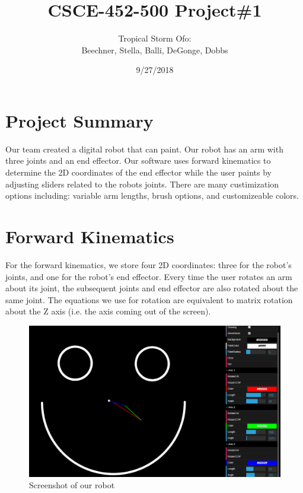 \documentclass{article}
\title{CSCE-452-500 Project\#1}
\author{Tropical Storm Ofo: \\ Beechner, Stella, Balli, DeGonge, Dobbs}
\date{9/27/2018}
\begin{document}
\maketitle %

\section*{Project Summary}
Our team created a digital robot that can paint. Our robot has an arm with three joints and an end effector. Our software uses forward kinematics to determine the 2D coordinates of the end effector while the user paints by adjusting sliders related to the robots joints. There are many custimization options including: variable arm lengths, brush options, and customizeable colors.

\section*{Forward Kinematics}
For the forward kinematics, we store four 2D coordinates: three for the robot's joints, and one for the robot's end effector. Every time the user rotates an arm about its joint, the subsequent joints and end effector are also rotated about the same joint. The equations we use for rotation are equivalent to matrix rotation about the Z axis (i.e. the axis coming out of the screen). 

\begin{figure}
\includegraphics[width=\linewidth]{screen.png}
\caption{Screenshot of our robot}
\end{figure}
\end{document}
